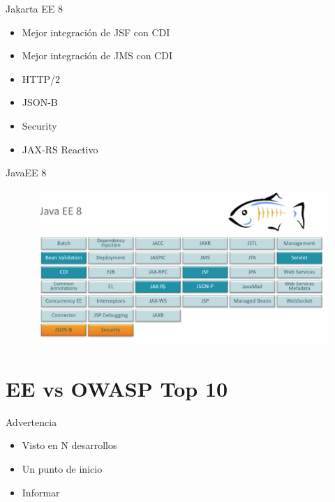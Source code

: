 \documentclass[aspectratio=169]{beamer}
\begin{document}
\begin{frame}{Jakarta EE 8}
    \begin{itemize}
        \item Mejor integración de JSF con CDI
        \item Mejor integración de JMS con CDI
        \item HTTP/2
        \item JSON-B
        \item Security
        \item JAX-RS Reactivo
    \end{itemize}
\end{frame}

\begin{frame}{JavaEE 8}
    \begin{figure}
        \centering
        \includegraphics[width=0.9\linewidth]{Images/javaee8}
    \end{figure}
\end{frame}


\section{EE vs OWASP Top 10}

\begin{frame}{Advertencia}
    \begin{itemize}
        \item Visto en N desarrollos
        \item Un punto de inicio
        \item Informar
    \end{itemize}
\end{frame}
\end{document}
